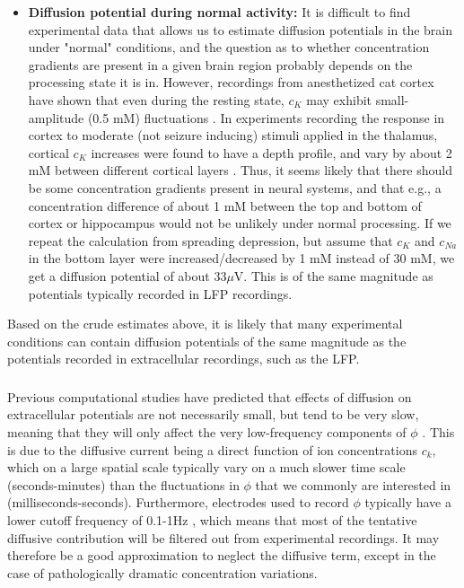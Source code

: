 \begin{itemize}
\item{\bf Diffusion potential during normal activity:} It is difficult to find experimental data that allows us to estimate diffusion potentials in the brain under "normal" conditions, and the question as to whether concentration gradients are present in a given brain region probably depends on the processing state it is in. However, recordings from anesthetized cat cortex have shown that even during the resting state, $c_K$ may exhibit small-amplitude (0.5 mM) fluctuations \citep{MCCREERY1983}. In experiments recording the response in cortex to moderate (not seizure inducing) stimuli applied in the thalamus, cortical $c_K$ increases were found to have a depth profile, and vary by about 2 mM between different cortical layers \citep{Cordingley1978}. Thus, it seems likely that there should be some concentration gradients present in neural systems, and that e.g., a concentration difference of about 1 mM between the top and bottom of cortex or hippocampus would not be unlikely under normal processing. If we repeat the calculation from spreading depression, but assume that $c_{K}$ and $c_{Na}$ in the bottom layer were increased/decreased by 1 mM instead of 30 mM, we get a diffusion potential of about $33 \mu$V. This is of the same magnitude as potentials typically recorded in LFP recordings. 

\end{itemize}

Based on the crude estimates above, it is likely that many experimental conditions can contain diffusion potentials of the same magnitude as the potentials recorded in extracellular recordings, such as the LFP. 


\subsubsection{}

Previous computational studies have predicted that effects of diffusion on extracellular potentials are not necessarily small, but tend to be very slow, meaning that they will only affect the very low-frequency components of $\phi$ \citep{Halnes2016, Halnes2017}. This is due to the diffusive current being a direct function of ion concentrations $c_k$, which on a large spatial scale typically vary on a much slower time scale (seconds-minutes) than the fluctuations in $\phi$ that we commonly are interested in (milliseconds-seconds). Furthermore, electrodes used to record $\phi$ typically have a lower cutoff frequency of 0.1-1Hz \citep{Einevoll2013}, which means that most of the tentative diffusive contribution will be filtered out from experimental recordings. It may therefore be a good approximation to neglect the diffusive term, except in the case of pathologically dramatic concentration variations.
